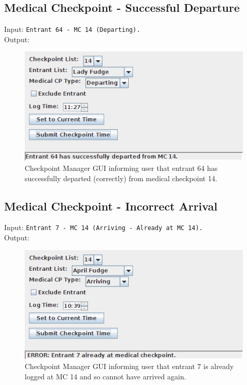 \documentclass[a4paper, 10pt]{article}
\begin{document}
\clearpage
\subsection{Medical Checkpoint - Successful Departure}

Input: \verb+Entrant 64 - MC 14 (Departing).+ \\

Output:
\begin{figure}[ht!]
\centering
\includegraphics[scale=0.7]{cm-mcdepartsuccess.png}
\caption{Checkpoint Manager GUI informing user that entrant 64 has successfully departed (correctly) from medical checkpoint 14.}
\end{figure}

\subsection{Medical Checkpoint - Incorrect Arrival}

Input: \verb+Entrant 7 - MC 14 (Arriving - Already at MC 14).+ \\

Output:
\begin{figure}[ht!]
\centering
\includegraphics[scale=0.7]{cm-mcarrivefailure.png}
\caption{Checkpoint Manager GUI informing user that entrant 7 is already logged at MC 14 and so cannot have arrived again.}
\end{figure}
\end{document}
